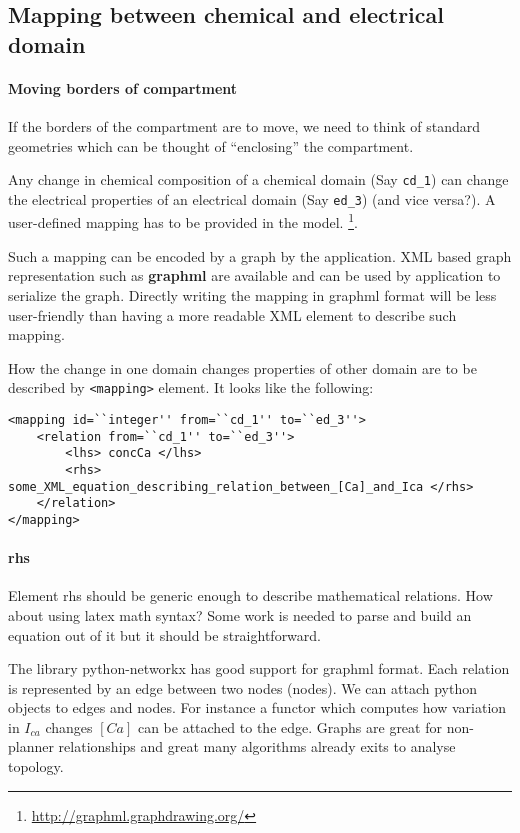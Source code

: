 \subsection{Mapping between chemical and electrical domain}

\paragraph{Moving borders of compartment}

    If the borders of the compartment are to move, we need to think of standard
    geometries which can be thought of ``enclosing'' the compartment.

Any change in chemical composition of a chemical domain (Say \texttt{cd\_1}) can
change the electrical properties of an electrical domain (Say \texttt{ed\_3})
(and vice versa?). A user-defined mapping has to be provided in the model.
\footnote{\url{http://graphml.graphdrawing.org/}}.


Such a mapping can be encoded by a graph by the application. XML based graph
representation such as \textbf{graphml} are available and can be used by
application to serialize the graph. Directly writing the mapping in graphml
format will be less user-friendly than having a more readable XML element to
describe such mapping.

How the change in one domain changes properties of other domain are to be
described by \texttt{<mapping>} element. It looks like the following:


\begin{verbatim}
<mapping id=``integer'' from=``cd_1'' to=``ed_3''>
    <relation from=``cd_1'' to=``ed_3''>
        <lhs> concCa </lhs>
        <rhs> some_XML_equation_describing_relation_between_[Ca]_and_Ica </rhs>
    </relation>
</mapping>
\end{verbatim}

\paragraph{rhs} Element rhs should be generic enough to describe mathematical
relations. How about using latex math syntax? Some work is needed to parse and
build an equation out of it but it should be straightforward. 


The library python-networkx has good support for graphml format. Each relation
is represented by an edge between two nodes (nodes). We can attach python
objects to edges and nodes. For instance a functor which computes how variation
in $I_{ca}$ changes $[Ca]$ can be attached to the edge. Graphs are great for
non-planner relationships and great many algorithms already exits to analyse
topology.


